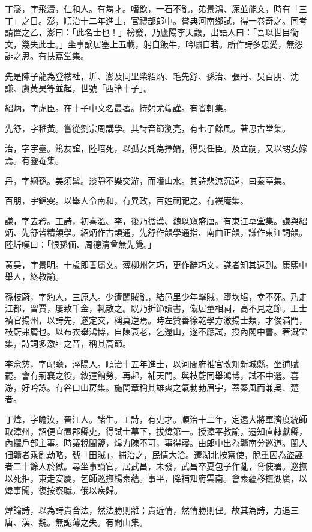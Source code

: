 \begin{pinyinscope}
丁澎，字飛濤，仁和人。有雋才。嗜飲，一石不亂，弟景鴻、溁並能文，時有「三丁」之目。澎，順治十二年進士，官禮部郎中。嘗典河南鄉試，得一卷奇之。同考請置之乙，澎曰：「此名士也！」榜發，乃廬陽李天馥，出語人曰：「吾以世目衡文，幾失此士。」坐事謫居塞上五載，躬自飯牛，吟嘯自若。所作詩多忠愛，無怨誹之思。有扶荔堂集。

先是陳子龍為登樓社，圻、澎及同里柴紹炳、毛先舒、孫治、張丹、吳百朋、沈謙、虞黃昊等並起，世號「西泠十子」。

紹炳，字虎臣。在十子中文名最著。持躬尤端謹。有省軒集。

先舒，字稚黃。嘗從劉宗周講學。其詩音節瀏亮，有七子餘風。著思古堂集。

治，字宇臺。篤友誼，陸培死，以孤女託為擇婿，得吳任臣。及立嗣，又以甥女嫁焉。有鑒菴集。

丹，字綱孫。美須髯。淡靜不樂交游，而嗜山水。其詩悲涼沉遠，曰秦亭集。

百朋，字錦雯。以舉人令南和，有異政，百姓祠祀之。有襆庵集。

謙，字去矜。工詩，初喜溫、李，後乃循漢、魏以窺盛唐。有東江草堂集。謙與紹炳、先舒皆精韻學。紹炳作古韻通，先舒作韻學通指、南曲正韻，謙作東江詞韻。陸圻嘆曰：「恨孫偭、周德清曾無先覺。」

黃昊，字景明。十歲即善屬文。薄柳州乞巧，更作辭巧文，識者知其遠到。康熙中舉人，終教諭。

孫枝蔚，字豹人，三原人。少遭闖賊亂，結邑里少年擊賊，墮坎埳，幸不死。乃走江都，習賈，屢致千金，輒散之。既乃折節讀書，僦居董相祠，高不見之節。王士禎官揚州，以詩先，遂定交，稱莫逆焉。時左贊善徐乾學方激揚士類，才俊滿門，枝蔚弗屑也。以布衣舉鴻博，自陳衰老，乞還山，遂不應試，授內閣中書。著溉堂集，詩詞多激壯之音，稱其高節。

李念慈，字屺瞻，涇陽人。順治十五年進士，以河間府推官改知新城縣。坐逋賦罷。會有荊襄之役，敘運餉勞，再起，補天門。與枝蔚同舉鴻博，試不中選。喜游，好吟詠。有谷口山房集。施閏章稱其雄爽之氣勃勃眉宇，蓋秦風而兼吳、楚者。

丁煒，字瞻汝，晉江人。諸生。工詩，有吏才。順治十二年，定遠大將軍濟度統師取漳州，詔便宜置郡縣吏，得試士幕下，拔煒第一。授漳平教諭，遷知直隸獻縣，內擢戶部主事。時議稅閩鹽，煒力陳不可，事得寢。由郎中出為贛南分巡道。閩人佃贛者乘亂劫略，號「田賊」，捕治之，民情大洽。遷湖北按察使，脫重囚為盜誣者二十餘人於獄。尋坐事謫官，居武昌，未發，武昌卒夏包子作亂，脅使署。巡撫以死拒，東走安慶，乞師巡撫楊素蘊。事平，降補知府雲南。會素蘊移撫湖廣，以煒事聞，復按察職。俄以疾歸。

煒論詩，以為詩貴合法，然法勝則離；貴近情，然情勝則俚。故其為詩，力追三唐、漢、魏。無詭薄之失。有問山集。


\end{pinyinscope}
